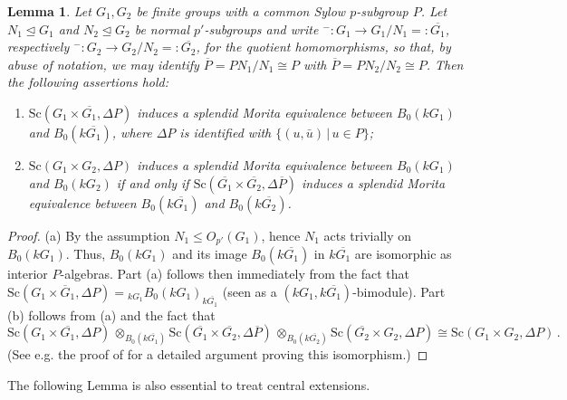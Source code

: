 \documentclass[12pt,a4paper]{amsart}
\theoremstyle{plain}\newtheorem{Theorem}{Theorem}[section]
\theoremstyle{plain}\newtheorem{Conjecture}[Theorem]{Conjecture}
\theoremstyle{plain}\newtheorem{Corollary}[Theorem]{Corollary}
\theoremstyle{plain}\newtheorem{Lemma}[Theorem]{Lemma}
\theoremstyle{plain}\newtheorem{Proposition}[Theorem]{Proposition}
\theoremstyle{definition}\newtheorem{Definition}[Theorem]{Definition}
\theoremstyle{definition}\newtheorem{Example}[Theorem]{Example}
\theoremstyle{definition}\newtheorem{Examples}[Theorem]{Examples}
\theoremstyle{definition}\newtheorem{Remark}[Theorem]{Remark}
\theoremstyle{definition}\newtheorem{Question}[Theorem]{Question}
\theoremstyle{definition}\newtheorem{Notation}[Theorem]{Notation}
\theoremstyle{definition}\newtheorem{Hypothesis}[Theorem]{Hypothesis}
\theoremstyle{definition}\newtheorem{Assumption}[Theorem]{Assumption}
\theoremstyle{definition}\newtheorem{Strategy}[Theorem]{Strategy}
\theoremstyle{definition}\newtheorem{Contents}[Theorem]{Contents}
\theoremstyle{definition}\newtheorem{Computations}[Theorem]{Computations}
\theoremstyle{definition}\newtheorem{Equivalences}[Theorem]{Equivalences}
\theoremstyle{definition}\newtheorem{Notation/Definition}[Theorem]{Notation/Definition}
\theoremstyle{definition}\newtheorem{noth}[Theorem]{}
\theoremstyle{plain}\newtheorem{Step}[Theorem]{Step}
\begin{document}
\begin{Lemma}\label{lem:G/Op'(G)}%
Let $G_{1}, G_{2}$ be finite groups with a common Sylow $p$-subgroup $P$. Let $N_{1}\unlhd G_{1}$ and $N_{2}\unlhd G_{2}$ be normal $p'$-subgroups and write $^{-}:G_{1}\longrightarrow G_{1}/N_{1}=:\overline{G_{1}}$, respectively {$^{-}:G_{2}\longrightarrow G_{2}/N_{2}=:\overline{G_{2}}$},  for the quotient homomorphisms, so that, by abuse of notation, we may identify  $\overline{P}=PN_{1}/N_{1}\cong P$ with $\overline{P}=PN_{2}/N_{2}\cong P$.   Then the following assertions hold: 
\begin{enumerate}[label={\rm(\alph*)}] 
\item
${\mathrm{Sc}}(G_{1}\times\overline{G_{1}}, \Delta P)$ induces 
a splendid Morita equivalence between $B_0(kG_{1})$ and $B_0(k\overline{G_{1}})$, where 
$\Delta P$ is identified with $\{(u, \bar u)\,|\, u\in P\}$;
\item
${\mathrm{Sc}}(G_{1}\times G_2,\Delta P)$ induces a splendid Morita equivalence
between $B_0(kG_{1})$ and $B_0(kG_{2})$ if and only if 
${\mathrm{Sc}}(\overline{G_{1}}\times\overline{G_{2}},\Delta\overline{P})$ induces
a splendid Morita equivalence 
between $B_0(k\overline{G_{1}})$ and $B_0(k\overline{G_{2}})$. 
\end{enumerate}
\end{Lemma}
%
\begin{proof} {\rm (a)} By the assumption $N_{1}\leq O_{p'}(G_{1})$, hence $N_{1}$ acts trivially on $B_0(kG_{1})$. 
Thus, $B_0(kG_{1})$ and its image $B_0(k\overline{G_{1}})$ in $k\overline{G_{1}}$ are isomorphic as
interior $P$-algebras. Part (a) follows then immediately from the fact that 
${\mathrm{Sc}}(G_{1}\times\overline G_{1}, \Delta P)={_{kG_{1}}B_0(kG_{1})}_{k\overline{G_{1}}}$ (seen as a $(kG_{1},k\overline{G_{1}})$-bimodule). Part {\rm (b)} follows from {\rm(a)} and the fact that
$${\mathrm{Sc}}(G_{1}\times\overline{G_{1}}, \Delta P)\,\otimes_{B_{0}(k\overline{G_{1}})} {\mathrm{Sc}}(\overline{G_{1}}\times \overline{G_2},\Delta \overline{P}) \,\otimes_{B_{0}(k\overline{G_{2}})} {\mathrm{Sc}}(\overline{G_{2}}\times G_{2}, \Delta P) 
 \cong  {\mathrm{Sc}}(G_{1}\times G_{2},\Delta P)\,.$$
 (See e.g. the proof of \cite[Lemma~5.1]{KLS20} for a detailed argument proving this isomorphism.)
\end{proof}




The following Lemma is also essential to treat central extensions. 
\end{document}
